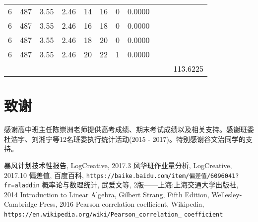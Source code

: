 \documentclass{article}
\begin{document}
\begin{CJK}{UTF8}{song}
\begin{table}[tbp]
\begin{center}
\begin{threeparttable}[b]
\begin{tabular}{ccccrrrrrrr}
6 & 487 & 3.55 & 2.46 & 14 & 16 & 0 & 0.0000  &  &  & \\
6 & 487 & 3.55 & 2.46 & 16 & 18 & 0 & 0.0000  &  &  & \\
6 & 487 & 3.55 & 2.46 & 18 & 20 & 0 & 0.0000  &  &  & \\
6 & 487 & 3.55 & 2.46 & 20 & 22 & 1 & 0.0000  &  &  & \\
 &  &  &  &  &  &  &  &  &  & 113.6225 \\
  \bottomrule
  \end{tabular}
\end{threeparttable}
\end{center}
\end{table}	

\section{致谢}
感谢高中班主任陈崇洲老师提供高考成绩、期末考试成绩以及相关支持。感谢班委杜浩宇、刘湘宁等12名班委执行统计活动(2015 - 2017)。特别感谢谷文治同学的支持。

\begin{thebibliography}{}
\bibitem[1]{}
暴风计划技术性报告, LogCreative, 2017.3
\bibitem[2]{}
风华班作业量分析, LogCreative, 2017.10
\bibitem[3]{}
偏差值, 百度百科, \verb"https://baike.baidu.com/item/偏差值/6096041?fr=aladdin"
\bibitem[4]{}
概率论与数理统计, 武爱文等, 2版——上海:上海交通大学出版社, 2014
\bibitem[5]{}
Introduction to Linear Algebra, Gilbert Strang, Fifth Edition, Wellesley-Cambridge Press, 2016
\bibitem[6]{}
Pearson correlation coefficient, Wikipedia, \verb"https://en.wikipedia.org/wiki/Pearson_correlation_" \verb"coefficient"
\end{thebibliography}


\end{CJK}
\end{document}
